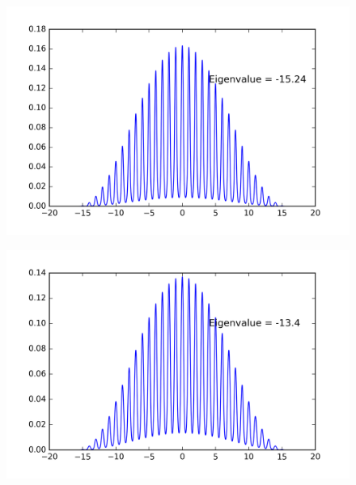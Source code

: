 \begin{figure}[!htbh]
\centering
\begin{minipage}{.45\textwidth}
  \centering
  \includegraphics[width=1.1\linewidth]{floatingPrecision/newPot100discrete_1th_Lowest0_4.png}
  \label{fig:newPo_0.4}
\end{minipage}\qquad
\begin{minipage}{.45\textwidth}
  \centering
  \includegraphics[width=1.1\linewidth]{floatingPrecision/newPot100discrete_1th_Lowest0_5.png}
  \label{fig:newPo_0.5}
\end{minipage}
\end{figure}

\newpage
